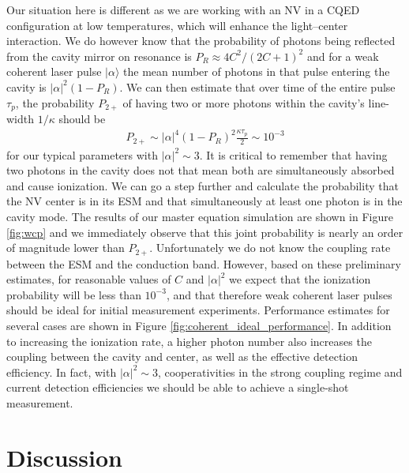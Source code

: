 \documentclass[aps,pra,amsmath,amssymb,reprint,superscriptaddress,tightenlines]{revtex4-1}
\begin{document}
Our situation here is different as we are working with an NV in a CQED configuration at low temperatures, which will enhance the light--center interaction. We do however know that the probability of photons being reflected from the cavity mirror on resonance is {$P_{R} \approx 4 C^2/(2C+1)^2$} and for a weak coherent laser pulse $|\alpha\rangle$ the mean number of photons in that pulse entering the cavity is $|\alpha|^2 (1-P_{R})$. We can then estimate that over time of the entire pulse $\tau_{p}$, the probability $P_{2+}$ of having two or more photons within the cavity's line-width $1/\kappa$ should be 
\begin{eqnarray}
P_{2+}  \sim |\alpha|^4 (1-P_R)^2 \frac{\kappa \tau_p}{2}\sim 10^{-3}
\label{estimate}
\end{eqnarray}
for our typical parameters with $|\alpha|^2\sim 3$. It is critical to remember that having two photons in the cavity does not that mean both are simultaneously absorbed and cause ionization. We can go a step further and calculate the probability that the NV center is in its ESM and that simultaneously at least one photon is in the cavity mode. The results of our master equation simulation are shown in Figure \ref{fig:wcp} and we immediately observe that this joint probability is nearly an order of magnitude lower than $P_{2+}$. Unfortunately we do not know the coupling rate between the ESM and the conduction band. However, based on these preliminary estimates, for reasonable values of $C$ and $|\alpha|^2$ we expect that the ionization probability will be less than $10^{-3}$, and that therefore weak coherent laser pulses should be ideal for initial measurement experiments. Performance estimates for several cases are shown in Figure \ref{fig:coherent_ideal_performance}. In addition to increasing the  ionization  rate, a higher photon number also increases the coupling between the cavity and center, as well as the effective detection efficiency. In fact, with $|\alpha|^2\sim 3$, cooperativities in the strong coupling regime and current detection efficiencies we should be able to achieve a single-shot measurement.

\section{Discussion} 
\label{sec:discussion}
\end{document}

